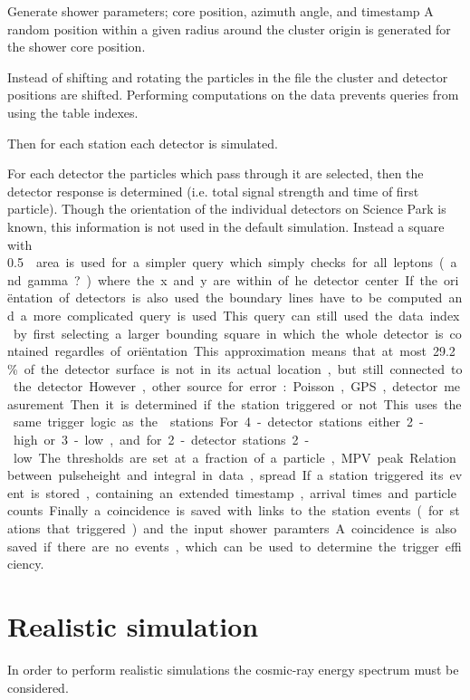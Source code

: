 Generate shower parameters; core position, azimuth angle, and timestamp
A random position within a given radius around the cluster origin is
generated for the shower core position.

Instead of shifting and rotating the particles in the \corsika file the
cluster and detector positions are shifted. Performing computations on
the \corsika data prevents queries from using the table indexes.

Then for each station each detector is simulated.

For each detector the particles which pass through it are selected, then the detector response is determined (i.e. total signal strength and time of first
particle). Though the orientation of the individual detectors on Science
Park is known, this information is not used in the default simulation.
Instead a square with \SI{.5}{\meter\square} area is used for a simpler query
which simply checks for all leptons (and gamma?) where the x and y are
within .. of he detector center. If the oriëntation of detectors is also
used the boundary lines have to be computed and a more complicated query
is used. This query can still used the data index by first selecting a
larger bounding square in which the whole detector is contained
regardles of oriëntation. This approximation means that at most
\SI{29.2}{\percent} of the detector surface is not in its actual
location, but still connected to the detector. However, other source for
error: Poisson, GPS, detector measurement.

Then it is determined if the station triggered or not. This uses the
same trigger logic as the \hisparc stations. For 4-detector stations
either 2-high or 3-low, and for 2-detector stations 2-low. The
thresholds are set at a fraction of a particle, MPV peak.. Relation
between pulseheight and integral in data, spread..

If a station triggered its event is stored, containing an extended
timestamp, arrival times and particle counts.

Finally a coincidence is saved with links to the station events (for
stations that triggered) and the input shower paramters. A coincidence
is also saved if there are no events, which can be used to determine the
trigger efficiency.


\section{Realistic simulation}

In order to perform realistic simulations the cosmic-ray energy spectrum
must be considered.

